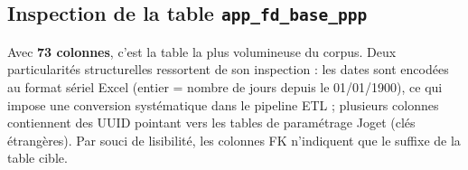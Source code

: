 \subsection{Inspection de la table \texttt{app\_fd\_base\_ppp}}

Avec \textbf{73 colonnes}, c'est la table la plus volumineuse du
corpus. Deux particularités structurelles ressortent de son
inspection : les dates sont encodées au format sériel Excel
(entier = nombre de jours depuis le 01/01/1900), ce qui impose
une conversion systématique dans le pipeline ETL ; plusieurs
colonnes contiennent des UUID pointant vers les tables de
paramétrage Joget (clés étrangères). Par souci de lisibilité,
les colonnes FK n'indiquent que le suffixe de la table cible.

